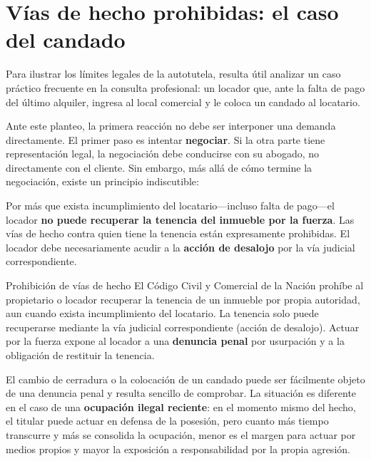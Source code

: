 \documentclass[12pt,oneside]{book}
\begin{document}
\section{Vías de hecho prohibidas: el caso del candado}

Para ilustrar los límites legales de la autotutela, resulta útil
analizar un caso práctico frecuente en la consulta profesional: un
locador que, ante la falta de pago del último alquiler, ingresa al
local comercial y le coloca un candado al locatario.

Ante este planteo, la primera reacción no debe ser interponer una
demanda directamente. El primer paso es intentar \textbf{negociar}.
Si la otra parte tiene representación legal, la negociación debe
conducirse con su abogado, no directamente con el cliente. Sin embargo,
más allá de cómo termine la negociación, existe un principio
indiscutible:

\begin{important}
Por más que exista incumplimiento del locatario---incluso falta de
pago---el locador \textbf{no puede recuperar la tenencia del inmueble
por la fuerza}. Las vías de hecho contra quien tiene la tenencia están
expresamente prohibidas. El locador debe necesariamente acudir a la
\textbf{acción de desalojo} por la vía judicial correspondiente.
\end{important}

\begin{normref}{Prohibición de vías de hecho}
El Código Civil y Comercial de la Nación prohíbe al propietario o
locador recuperar la tenencia de un inmueble por propia autoridad,
aun cuando exista incumplimiento del locatario. La tenencia solo puede
recuperarse mediante la vía judicial correspondiente (acción de
desalojo). Actuar por la fuerza expone al locador a una \textbf{denuncia
penal} por usurpación y a la obligación de restituir la tenencia.
\end{normref}

\begin{note}
El cambio de cerradura o la colocación de un candado puede ser
fácilmente objeto de una denuncia penal y resulta sencillo de comprobar.
La situación es diferente en el caso de una \textbf{ocupación ilegal
reciente}: en el momento mismo del hecho, el titular puede actuar en
defensa de la posesión, pero cuanto más tiempo transcurre y más se
consolida la ocupación, menor es el margen para actuar por medios
propios y mayor la exposición a responsabilidad por la propia agresión.
\end{note}
\end{document}
